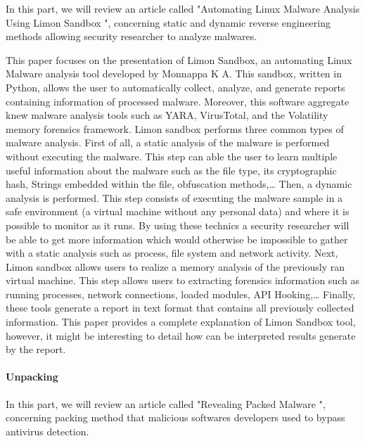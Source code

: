 In this part, we will review an article called "Automating Linux Malware Analysis Using
Limon Sandbox ", concerning static and dynamic reverse engineering methods allowing 
security researcher to analyze malwares.

This paper focuses on the presentation of Limon Sandbox, an automating Linux Malware
analysis tool developed by Monnappa K A. This sandbox, written in Python, allows the user
to automatically collect, analyze, and generate reports containing information of processed
malware. Moreover, this software aggregate knew malware analysis tools such as YARA, 
VirusTotal, and the Volatility memory forensics framework. Limon sandbox performs three 
common types of malware analysis. First of all, a static analysis of the malware is
performed without executing the malware. This step can able the user to learn multiple
useful information about the malware such as the file type, its cryptographic hash, Strings
embedded within the file, obfuscation methods,… Then, a dynamic analysis is performed.
This step consists of executing the malware sample in a safe environment (a virtual machine
without any personal data) and where it is possible to monitor as it runs. By using these
technics a security researcher will be able to get more information which would otherwise
be  impossible to gather with a static analysis such as process, file system and network
activity. Next, Limon sandbox allows users to realize a memory analysis of the previously
ran virtual machine. This step allows users to extracting forensics information such as 
running processes, network connections, loaded modules, API Hooking,…
Finally, these tools generate a report in text format that contains all previously
collected information. This paper provides a complete explanation of Limon Sandbox tool,
however, it might be interesting to detail how can be interpreted results generate by the
report.


\paragraph{Unpacking} %

In this part, we will review an article called "Revealing Packed Malware ", concerning 
packing method that malicious softwares developers used to bypass antivirus detection. 

